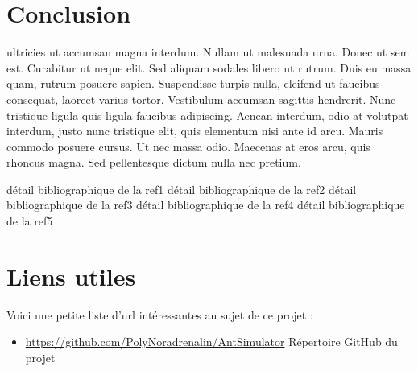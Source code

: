\documentclass{EPUProjetDi}
\begin{document}
\chapter*{Conclusion}
 ultricies ut accumsan magna interdum. Nullam ut malesuada urna. Donec ut sem est. Curabitur ut neque elit. Sed aliquam sodales libero ut rutrum. Duis eu massa quam, rutrum posuere sapien. Suspendisse turpis nulla, eleifend ut faucibus consequat, laoreet varius tortor. Vestibulum accumsan sagittis hendrerit. Nunc tristique ligula quis ligula faucibus adipiscing. Aenean interdum, odio at volutpat interdum, justo nunc tristique elit, quis elementum nisi ante id arcu. Mauris commodo posuere cursus. Ut nec massa odio. Maecenas at eros arcu, quis rhoncus magna. Sed pellentesque dictum nulla nec pretium.

\begin{thebibliography}{99}
\label{sec:biblio}
  détail bibliographique de la ref1
  détail bibliographique de la ref2
  détail bibliographique de la ref3
  détail bibliographique de la ref4
  détail bibliographique de la ref5
\end{thebibliography}


\appendix
{}


\chapter{Liens utiles\label{sec:liens_utiles}}
Voici une petite liste d'url intéressantes au sujet de ce projet :

\begin{itemize}
\item {\url{https://github.com/PolyNoradrenalin/AntSimulator} Répertoire GitHub du projet}
\end{itemize}

\end{document}
